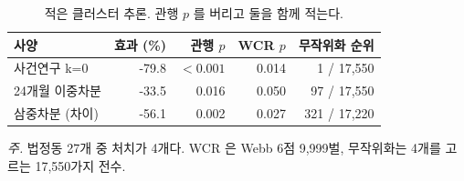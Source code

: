 \begin{table}[htbp]
  \centering
  \caption{적은 클러스터 추론. 관행 $p$ 를 버리고 둘을 함께 적는다.}
  \label{tab:inference}
  \begin{tabular}{lrrrr}
    \toprule
    \textbf{사양} & \textbf{효과 (\%)} & \textbf{관행 $p$} & \textbf{WCR $p$} & \textbf{무작위화 순위} \\
    \midrule
    사건연구 k=0 & -79.8 & $<0.001$ & 0.014 & 1 / 17,550 \\
    24개월 이중차분 & -33.5 & 0.016 & 0.050 & 97 / 17,550 \\
    삼중차분 (차이) & -56.1 & 0.002 & 0.027 & 321 / 17,220 \\
    \bottomrule
  \end{tabular}

  \begin{minipage}{\linewidth}\footnotesize
  \textit{주.} 법정동 27개 중 처치가 4개다. WCR 은 Webb 6점 9,999벌, 무작위화는 4개를 고르는 17,550가지 전수.
  \end{minipage}
\end{table}
